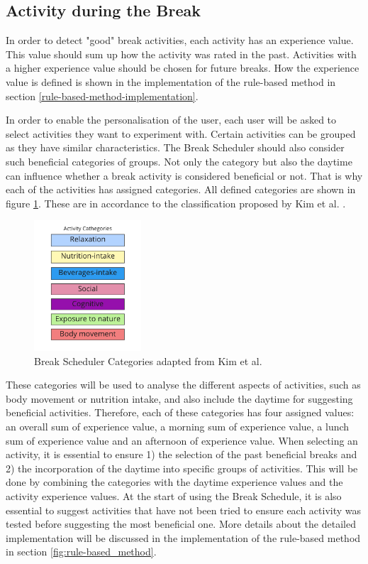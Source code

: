 \documentclass{hasel_thesis}
\begin{document}
\subsection{Activity during the Break}
In order to detect "good" break activities, each activity has an experience value. This value should sum up how the activity was rated in the past. Activities with a higher experience value should be chosen for future breaks. How the experience value is defined is shown in the implementation of the rule-based method in section \ref{rule-based-method-implementation}. 

In order to enable the personalisation of the user, each user will be asked to select activities they want to experiment with.
Certain activities can be grouped as they have similar characteristics. The Break Scheduler should also consider such beneficial categories of groups. Not only the category but also the daytime can influence whether a break activity is considered beneficial or not. That is why each of the activities has assigned categories. All defined categories are shown in figure \ref{fig:categories}. These are in accordance to the classification proposed by Kim et al. \cite{KimS.ParkY.&Niu.2017}.

\begin{figure}[htp]
    \centering
    \includegraphics[width=4cm]{hasel_thesis/images/categories.png}
    \caption{Break Scheduler Categories adapted from Kim et al. \cite{KimS.ParkY.&Niu.2017} }
    \label{fig:categories}
\end{figure}

These categories will be used to analyse the different aspects of activities, such as body movement or nutrition intake, and also include the daytime for suggesting beneficial activities. Therefore, each of these categories has four assigned values: an overall sum of experience value, a morning sum of experience value, a lunch sum of experience value and an afternoon of experience value. When selecting an activity, it is essential to ensure 1) the selection of the past beneficial breaks and 2) the incorporation of the daytime into specific groups of activities. This will be done by combining the categories with the daytime experience values and the activity experience values. At the start of using the Break Schedule, it is also essential to suggest activities that have not been tried to ensure each activity was tested before suggesting the most beneficial one. More details about the detailed implementation will be discussed in the implementation of the rule-based method in section \ref{fig:rule-based_method}.
\end{document}
